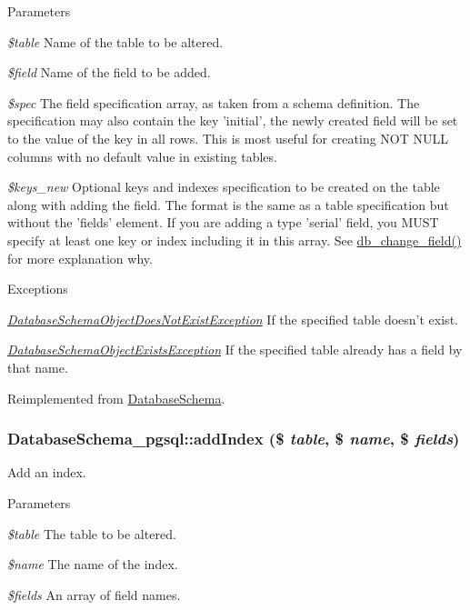 \begin{DoxyParams}{Parameters}
\item[{\em \$table}]Name of the table to be altered. \item[{\em \$field}]Name of the field to be added. \item[{\em \$spec}]The field specification array, as taken from a schema definition. The specification may also contain the key 'initial', the newly created field will be set to the value of the key in all rows. This is most useful for creating NOT NULL columns with no default value in existing tables. \item[{\em \$keys\_\-new}]Optional keys and indexes specification to be created on the table along with adding the field. The format is the same as a table specification but without the 'fields' element. If you are adding a type 'serial' field, you MUST specify at least one key or index including it in this array. See \hyperlink{group__schemaapi_ga9e0a4211eb8137e187d5f3f4fa716cea}{db\_\-change\_\-field()} for more explanation why.\end{DoxyParams}

\begin{DoxyExceptions}{Exceptions}
\item[{\em \hyperlink{classDatabaseSchemaObjectDoesNotExistException}{DatabaseSchemaObjectDoesNotExistException}}]If the specified table doesn't exist. \item[{\em \hyperlink{classDatabaseSchemaObjectExistsException}{DatabaseSchemaObjectExistsException}}]If the specified table already has a field by that name. \end{DoxyExceptions}


Reimplemented from \hyperlink{classDatabaseSchema_a54800af6c4094cea196e1c66b5106c99}{DatabaseSchema}.\hypertarget{classDatabaseSchema__pgsql_afced2f073c4a42004d74b6feb1f3f46e}{
\subsubsection[{addIndex}]{\setlength{\rightskip}{0pt plus 5cm}DatabaseSchema\_\-pgsql::addIndex (\$ {\em table}, \/  \$ {\em name}, \/  \$ {\em fields})}}
\label{classDatabaseSchema__pgsql_afced2f073c4a42004d74b6feb1f3f46e}
Add an index.


\begin{DoxyParams}{Parameters}
\item[{\em \$table}]The table to be altered. \item[{\em \$name}]The name of the index. \item[{\em \$fields}]An array of field names.\end{DoxyParams}

